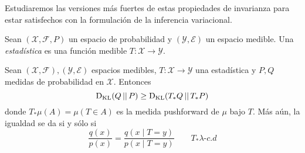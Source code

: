 \documentclass[main.tex]{subfiles}
\begin{document}
Estudiaremos las versiones más fuertes de estas propiedades de invarianza para
estar satisfechos con la formulación de la inferencia variacional. 

\begin{definition}
	Sean $(\mathcal{X}, \mathcal{F}, P)$ un espacio de probabilidad y
	$(\mathcal{Y}, \mathcal{E})$ un espacio medible. Una \textit{estadística} es
	una función medible $T:\mathcal{X} \to \mathcal{Y}$.
\end{definition}

\begin{theorem} 
	Sean $(\mathcal{X}, \mathcal{F}), (\mathcal{Y}, \mathcal{E})$ espacios medibles,
	$T: \mathcal{X} \to \mathcal{Y}$ una estadística y $P, Q$ medidas de
	probabilidad en $\mathcal{X}$. Entonces
	\begin{equation}\label{eq:info-pr}
		\operatorname*{D_{KL}}(Q \operatorname*{\mid\mid} P) \geq \operatorname*{D_{KL}}(T_*Q \operatorname*{\mid\mid} T_*P)
	\end{equation}
	donde $T_*\mu(A)=\mu\left(T \in A\right)$ es la medida pushforward de $\mu$
	bajo $T$. Más aún, la igualdad se da si y sólo si 
	\begin{equation}\label{eq:suf}
	\frac{q(x)}{p(x)}=
		\frac{q\left(x\mid T=y\right)}
			{p\left(x\mid T=y\right)}
		\qquad T_*\lambda\textit{-c.d}
	\end{equation}
\end{theorem}
\end{document}
